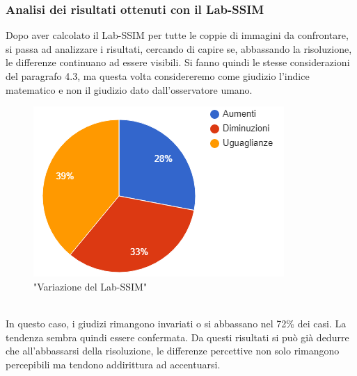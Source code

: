 \documentclass[a4paper,11pt]{article}
\begin{document}
    \subsubsection{Analisi dei risultati ottenuti con il Lab-SSIM}
    Dopo aver calcolato il Lab-SSIM per tutte le coppie di immagini da confrontare, si passa ad analizzare i risultati, cercando di capire
    se, abbassando la risoluzione, le differenze continuano ad essere visibili. Si fanno quindi le stesse considerazioni del paragrafo 4.3, ma questa volta
    considereremo come giudizio l'indice matematico e non il giudizio dato dall'osservatore umano.
    \begin{figure}[h]
        \centering
        \includegraphics{chart2}
        \caption{"Variazione del Lab-SSIM"}
    \end{figure}
    \\In questo caso, i giudizi rimangono invariati o si abbassano nel 72\% dei casi. La tendenza sembra quindi essere confermata.    Da questi risultati si può già dedurre che all'abbassarsi della risoluzione, le differenze percettive non solo rimangono percepibili ma tendono addirittura ad accentuarsi.
    \newpage
\end{document}
